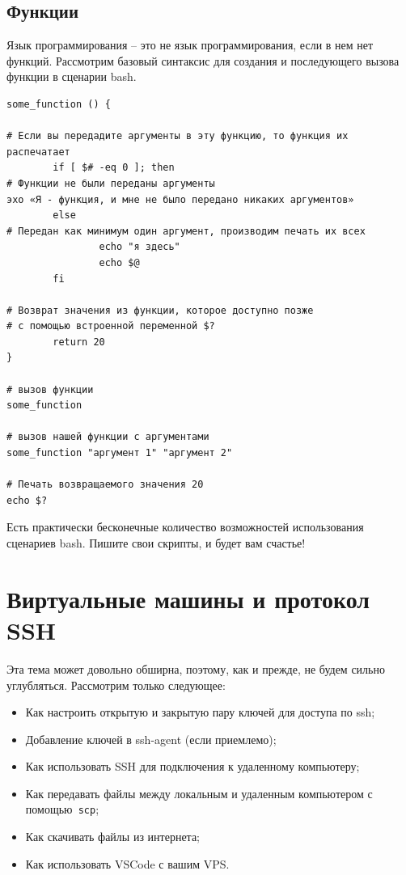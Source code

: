 \documentclass[a4paper,12pt,final,openany]{extbook}
\providecommand{\tightlist}{%
  \setlength{\itemsep}{0pt}\setlength{\parskip}{0pt}}
\begin{document}
\hypertarget{Functions}{%
\subsection{\texorpdfstring{\protect\hyperlink{Functions}{}Функции}{Функции}}\label{Functions}}

Язык программирования -- это не язык программирования, если в нем нет
функций. Рассмотрим базовый синтаксис для создания и последующего вызова
функции в сценарии bash.

\begin{verbatim}
some_function () {

# Если вы передадите аргументы в эту функцию, то функция их распечатает
        if [ $# -eq 0 ]; then
# Функции не были переданы аргументы
эхо «Я - функция, и мне не было передано никаких аргументов»
        else
# Передан как минимум один аргумент, производим печать их всех
                echo "я здесь"
                echo $@
        fi

# Возврат значения из функции, которое доступно позже
# с помощью встроенной переменной $?
        return 20
}

# вызов функции
some_function

# вызов нашей функции с аргументами
some_function "аргумент 1" "аргумент 2"

# Печать возвращаемого значения 20
echo $?
\end{verbatim}

Есть практически бесконечные количество возможностей использования
сценариев bash. Пишите свои скрипты, и будет вам счастье!

\hypertarget{Virtual-Machines-and-SSH-Protocol}{%
\section{\texorpdfstring{\protect\hyperlink{Virtual-Machines-and-SSH-Protocol}{}Виртуальные
машины и протокол
SSH}{Виртуальные машины и протокол SSH}}\label{Virtual-Machines-and-SSH-Protocol}}

Эта тема может довольно обширна, поэтому, как и прежде, не будем сильно
углубляться. Рассмотрим только следующее:

\begin{itemize}
\tightlist
\item
  Как настроить открытую и закрытую пару ключей для доступа по ssh;
\item
  Добавление ключей в ssh-agent (если приемлемо);
\item
  Как использовать SSH для подключения к удаленному компьютеру;
\item
  Как передавать файлы между локальным и удаленным компьютером с
  помощью\texttt{\ scp};
\item
  Как скачивать файлы из интернета;
\item
  Как использовать VSCode с вашим VPS.
\end{itemize}
\end{document}
